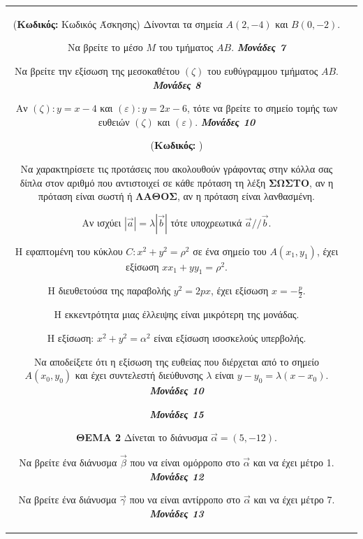 \documentclass[11pt,a4paper,twoside]{book}
\newcommand{\OnPar}[1]{{\notoserif\bfseries\fontsize{18}{22}\selectfont #1}}
\newcounter{askhsh}[chapter]
\renewcommand{\theaskhsh}{
	\bf{\titlefont{\Large{\thechapter}}.\arabic{askhsh}}
}
\newcommand{\Askhsh}[2]{\refstepcounter{askhsh}{\vspace{4mm}\titlefont{{\large Άσκηση}\theaskhsh} - \textcolor{maincolor}{ΘEMA #2}} ({\small{\textbf{Κωδικός:} #1}})}{}
\newcommand{\monades}[1]{
\hspace*{\fill}
\textbf{\textit{\textcolor{maincolor}{Μονάδες #1}}}}
\begin{document}
\begin{tabular}{cc}
\vspace{4mm}

\Askhsh{Κωδικός Άσκησης}{2}
Δίνονται τα σημεία $A(2, -4)$ και $B(0, -2)$.
\begin{alist}    \item Να βρείτε το μέσο $M$ του τμήματος $AB$. \monades{7}
    \item Να βρείτε την εξίσωση της μεσοκαθέτου $(\zeta)$ του ευθύγραμμου τμήματος $AB$. \monades{8}
    \item Αν $(\zeta): y = x - 4$ και $(\varepsilon): y = 2x - 6$, τότε να βρείτε το σημείο τομής των ευθειών $(\zeta)$ και $(\varepsilon)$. \monades{10}\end{alist}

\vspace{4mm}

\Askhsh{}{1}
\begin{alist}    \item Να χαρακτηρίσετε τις προτάσεις που ακολουθούν γράφοντας στην κόλλα σας δίπλα στον αριθμό που αντιστοιχεί σε κάθε πρόταση τη λέξη \textbf{ΣΩΣΤΟ}, αν η πρόταση είναι σωστή ή \textbf{ΛΑΘΟΣ}, αν η πρόταση είναι λανθασμένη.
    \begin{rlist}
        \item Αν ισχύει $\left|\vec{a}\right| = \lambda\left|\vec{b}\right|$ τότε υποχρεωτικά $\vec{a}//\vec{b}$.
        \item Η εφαπτομένη του κύκλου $C: x^2 + y^2 = \rho^2$ σε ένα σημείο του $A (x_1, y_1)$, έχει εξίσωση $xx_1 + yy_1 = \rho^2$.
        \item Η διευθετούσα της παραβολής $y^2 = 2px$, έχει εξίσωση $x = -\frac{p}{2}$.
        \item Η εκκεντρότητα μιας έλλειψης είναι μικρότερη της μονάδας.
        \item Η εξίσωση: $x^2 + y^2 = \alpha^2$ είναι εξίσωση ισοσκελούς υπερβολής.
    \end{rlist}
    \item Να αποδείξετε ότι η εξίσωση της ευθείας που διέρχεται από το σημείο $A(x_0, y_0)$ και έχει συντελεστή διεύθυνσης $\lambda$ είναι $y - y_0 = \lambda(x - x_0)$.  \monades{10}
 \monades{15}\end{alist}

\vspace{4mm}

\OnPar{ΘΕΜΑ 2}
Δίνεται το διάνυσμα $\vec{\alpha} = (5,-12)$.
\begin{alist}    \item Να βρείτε ένα διάνυσμα $\vec{\beta}$ που να είναι ομόρροπο στο $\vec{\alpha}$ και να έχει μέτρο 1. \monades{12}
    \item Να βρείτε ένα διάνυσμα $\vec{\gamma}$ που να είναι αντίρροπο στο $\vec{\alpha}$ και να έχει μέτρο 7. \monades{13}\end{alist}


\end{tabular}
\end{document}
